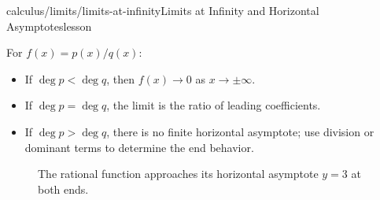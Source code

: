 \begin{webpage}{calculus/limits/limits-at-infinity}{Limits at Infinity and Horizontal Asymptotes}{lesson}
\begin{bgtheorem}[title={Rational-Function Degree Rules}]
For \(f(x)=p(x)/q(x)\):
\begin{itemize}
  \item If \(\deg p<\deg q\), then \(f(x)\to0\) as \(x\to\pm\infty\).
  \item If \(\deg p=\deg q\), the limit is the ratio of leading coefficients.
  \item If \(\deg p>\deg q\), there is no finite horizontal asymptote; use division or dominant terms to determine the end behavior.
\end{itemize}
\end{bgtheorem}

\begin{figure}[htbp]
\centering
{}
\caption{The rational function approaches its horizontal asymptote \(y=3\) at both ends.}
\label{fig:horizontal-asymptote}
\end{figure}
\end{webpage}

